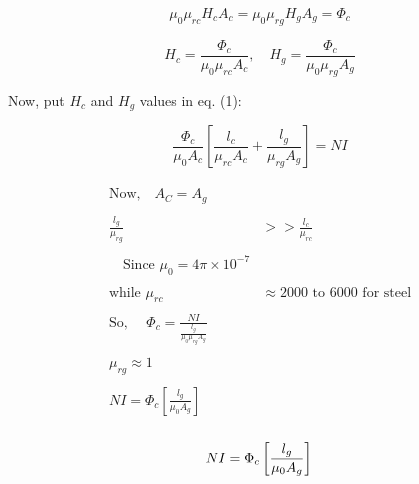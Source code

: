 \documentclass{article}
\begin{document}
\begin{equation}
    \mu_0 \mu_{rc} H_c A_c = \mu_0 \mu_{rg} H_g A_g = \Phi_c \tag{3}
\end{equation}

\begin{equation*}
    H_c = \frac{\Phi_c}{\mu_0\mu_{rc} A_c}, \quad H_g = \frac{\Phi_c}{\mu_0\mu_{rg} A_g}
\end{equation*}

Now, put \( H_c \) and \( H_g \) values in eq. (1):

\begin{equation}
    \frac{\Phi_c}{\mu_0 A_c} \left[ \frac{l_c}{\mu_{rc} A_c} + \frac{l_g}{\mu_{rg} A_g} \right] = NI
\end{equation}

\begin{align*}
\begin{split}
    \text{Now,} \quad A_C = A_g \\[0.5cm]\\
    \frac{l_g}{\mu_{rg}} &> >\frac{l_c}{\mu_{rc}}\\[0.5cm] \\
   \quad \text{Since } \mu_0 = 4\pi \times 10^{-7}\\[0.5cm] \\
    \text{while } \mu_{rc} &\approx 2000 \text{ to } 6000 \text{ for steel}\\[0.5cm] \\
    \text{So, } \quad \Phi_c = \frac{NI}{\frac{l_g}{\mu_0  \mu_{rg} A_g}}\\[0.5cm] \\
    \mu_{rg} \approx 1 \\[0.5cm]\\
    NI = \Phi_c \left[ \frac{l_g}{\mu_0 A_g} \right] \\ 
\end{split}
\end{align*}

\begin{tcolorbox}[colframe=red, boxrule=1mm, sharp corners=south] %
\[
    NI = \Phi_c \left[ \frac{l_g}{\mu_0 A_g} \right] \\ 
\]
\end{tcolorbox}
\end{document}
